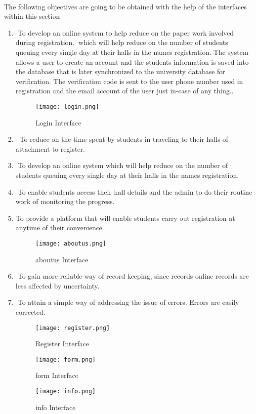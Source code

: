\documentclass[12pt]{article}
\begin{document}
		\paragraph{}
		The following objectives are going to be obtained with the help of the interfaces within this section
		\begin{enumerate}
	
		\itemTo develop an online system to help reduce on the paper work involved during registration.
		which will help reduce on the number of students queuing every single day at their halls in the names registration.
		The system allows a user to create an account and the students information is saved into the database that is later synchronized to the university database for verification.
		The verification code is sent to the user phone number used in registration and the email account of the user just in-case of any thing..
		\begin{figure}
			\texttt{[image: login.png]}
			\caption{Login Interface}
			\label{fig:login Interface}
		\end{figure}
		\itemTo reduce on the time spent by students in traveling to their halls of attachment to register.
		\itemTo develop an online system which will help reduce on the number of students queuing every single day at their halls in the names registration.
		\itemTo enable students access their hall details and the admin to do their routine work of monitoring the progress.
		\item To provide a platform that will enable students carry out registration at anytime of their convenience. 
			\begin{figure}
			\texttt{[image: aboutus.png]}
			\caption{aboutus Interface}
			\label{fig:AboutUs Interface}
		\end{figure}
		\itemTo gain more reliable way of record keeping, since records online records are less affected by uncertainty.
		\itemTo attain a simple way of addressing the issue of errors. Errors are easily corrected.
			\begin{figure}
			\texttt{[image: register.png]}
			\caption{Register Interface}
			\label{fig:Register Interface}
		\end{figure}
	
	\begin{figure}
		\texttt{[image: form.png]}
		\caption{form Interface}
		\label{fig:form Interface}
	\end{figure}


		\begin{figure}
		\texttt{[image: info.png]}
		\caption{info Interface}
		\label{fig:info Interface}
	\end{figure}	
	\end{enumerate}

\newpage
	 

		
\end{document}
